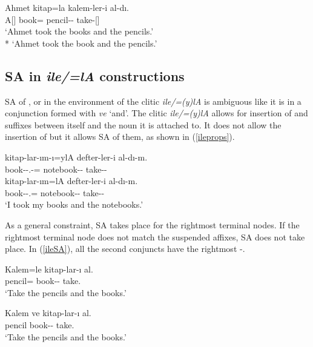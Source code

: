 \begin{exe}
    \ex \label{ileandSA}
    \gll Ahmet kitap=la kalem-ler-i al-dı. \\ 
    A[{\Nom}] book={\And} pencil-{\Pl}-{\Acc} take-{\Pst}[{\Tsg}] \\
    \glt `Ahmet took the books and the pencils.'\\*
    `Ahmet took the book and the pencils.'
\end{exe}


\subsection{SA in \textit{ile/=lA} constructions}

SA of {\Pl}, or {\Poss} in the environment of the clitic \textit{ile/=(y)lA} is ambiguous like it is in a conjunction formed with \textit{ve} `and'. The clitic \textit{ile/=(y)lA} allows for insertion of {\Pl} and {\Poss} suffixes between itself and the noun it is attached to. It does not allow the insertion of {\Case} but it allows SA of them, as shown in (\ref{ileprops}).

\begin{exe}
\ex \label{ileprops}
    \begin{xlist}
    \ex \gll *kitap-lar-ım-ı=ylA defter-ler-i al-dı-m. \\ 
    book-{\Pl}-{\Poss}.{\Fsg}-{\Acc}={\And} notebook-{\Pl}-{\Acc} take-{\Pst}-{\Fsg} \\

    \ex \gll kitap-lar-ım=lA defter-ler-i al-dı-m. \\ 
    book-{\Pl}-{\Poss}.{\Fsg}={\And} notebook-{\Pl}-{\Acc} take-{\Pst}-{\Fsg} \\
    \glt `I took my books and the notebooks.'
\end{xlist}
\end{exe}

As a general constraint, SA takes place for the rightmost terminal nodes. If the rightmost terminal node does not match the suspended affixes, SA does not take place. In (\ref{ileSA}), all the second conjuncts have the rightmost {\Pl-\Acc}. 

\begin{exe}
    \ex \label{ileSA}
    \begin{xlist}
        \ex \label{ilesa1}\gll Kalem=le kitap-lar-ı al. \\ 
        pencil={\Case} book-{\Pl}-{\Acc} take.{\Imp} \\
        \glt `Take the pencils and the books.'
        
        \ex \label{ilesa2}\gll Kalem ve kitap-lar-ı al. \\ 
        pencil {\And} book-{\Pl}-{\Acc} take.{\Imp} \\
        \glt `Take the pencils and the books.'
    \end{xlist}
\end{exe}

